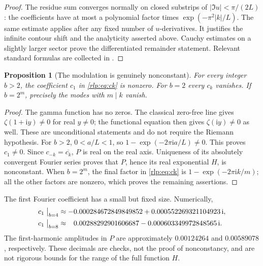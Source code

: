 \documentclass[11pt,letterpaper]{article}
\numberwithin{equation}{section}
\newtheorem{proposition}[theorem]{Proposition}
\theoremstyle{remark}\newtheorem{remark}[theorem]{Remark}
\newcommand{\ii}{\mathrm i}
\begin{document}
\begin{proof}
The residue sum converges normally on closed substrips of
$|\Im u|<\pi/(2L)$: the coefficients have at most a polynomial factor times
$\exp(-\pi^2|k|/L)$. The same estimate applies after any fixed number of $u$-derivatives. It justifies the infinite contour shift and the analyticity asserted above. Cauchy estimates on a slightly larger sector prove the differentiated remainder statement. Relevant standard formulas are collected in \cite{dlmf,mellin}.
\end{proof}

\begin{proposition}[The modulation is genuinely nonconstant]\label{rlp:prop:nonzero}
For every integer $b>2$, the coefficient $c_1$ in \eqref{rlp:eq:ck} is nonzero. For $b=2$ every $c_k$ vanishes. If $b=2^m$, precisely the modes with $m\mid k$ vanish.
\end{proposition}
\begin{proof}
The gamma function has no zeros. The classical zero-free line gives
$\zeta(1+\ii y)\ne0$ for real $y\ne0$; the functional equation then gives
$\zeta(\ii y)\ne0$ as well. These are unconditional statements and do not require the Riemann hypothesis. For $b>2$,
$0<a/L<1$, so $1-\exp(-2\pi\ii a/L)\ne0$. This proves $c_1\ne0$. Since $c_{-k}=\overline{c_k}$, $P$ is real on the real axis. Uniqueness of its absolutely convergent Fourier series proves that $P$, hence its real exponential $H$, is nonconstant. When $b=2^m$, the final factor in \eqref{rlp:eq:ck} is $1-\exp(-2\pi\ii k/m)$; all the other factors are nonzero, which proves the remaining assertions.
\end{proof}
The first Fourier coefficient has a small but fixed size. Numerically,
\begin{align*}
 c_1\bigm|_{b=4}&\approx-0.000284672849849852
             +0.000552269321104923\,\ii,\\
 c_1\bigm|_{b=8}&\approx\phantom{-}0.00288292901606687
             -0.000603349972848565\,\ii.
\end{align*}
The first-harmonic amplitudes in $P$ are approximately $0.00124264$ and $0.00589078$, respectively. These decimals are checks, not the proof of nonconstancy, and are not rigorous bounds for the range of the full function $H$.
\end{document}

